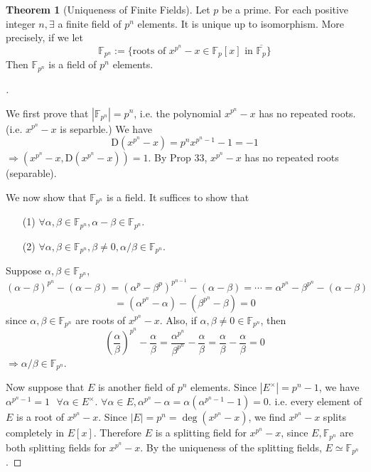 \documentclass[12pt]{article}
\newcommand{\sfa}{\text{  } \forall}
\theoremstyle{definition}
\newtheorem{thm}{Theorem}
\newenvironment{proofs}[1][\proofname]{%
  \begin{proof}[#1]$ $\par\nobreak\ignorespaces
}{%
  \end{proof}
}
\begin{document}
\clearpage
\begin{thm}[Uniqueness of Finite Fields]
	Let $p$ be a prime.
	For each positive integer $n, \exists$ a finite field of $p^n$ elements.
	It is unique up to isomorphism.
	More precisely, if we let
	\[
		\mathbb{F}_{p^n}:= \{ \text{roots of } x^{p^n} - x \in \mathbb{F}_p[x] \text{ in } \overline{\mathbb{F}_p} \}
	\]
	Then $\mathbb{F}_{p^n}$ is a field of $p^n$ elements.
\end{thm}

\begin{proofs}
	We first prove that $|\mathbb{F}_{p^n}| = p^n$, i.e. the polynomial $x^{p^n} - x$ has no repeated roots.(i.e. $x^{p^n} - x$ is separble.)
	We have
	\[
		\mathrm{D}(x^{p^n} - x) = p^n x^{p^n - 1} - 1 = -1
	\]
	$\Rightarrow (x^{p^n} - x, \mathrm{D} (x^{p^n} - x)) = 1$.
	By Prop 33, $x^{p^n} - x$ has no repeated roots (separable).

	We now show that $\mathbb{F}_{p^n}$ is a field.
	It suffices to show that
	\begin{enumerate}
		\item[(1)] $\forall \alpha, \beta \in \mathbb{F}_{p^n}, \alpha - \beta \in \mathbb{F}_{p^n}$.

		\item[(2)] $\forall \alpha, \beta \in \mathbb{F}_{p^n}, \beta \neq 0, \alpha/\beta \in \mathbb{F}_{p^n}$.
	\end{enumerate}
	Suppose $\alpha, \beta \in \mathbb{F}_{p^n}$,
	\[
		(\alpha - \beta)^{p^n} - (\alpha - \beta) = (\alpha^p - \beta^p)^{p^{n - 1}} - (\alpha - \beta) = \cdots = \alpha^{p^n} - \beta^{p^n} - (\alpha - \beta)
	\]
	\[
		= (\alpha^{p^n} - \alpha) - (\beta^{p^n} - \beta) = 0
	\]
	since $\alpha, \beta \in \mathbb{F}_{p^n}$ are roots of $x^{p^n} - x$.
	Also, if $\alpha, \beta \neq 0 \in \mathbb{F}_{p^n}$, then
	\[
		\left(\frac{\alpha}{\beta}\right)^{p^n} - \frac{\alpha}{\beta} = \frac{\alpha^{p^n}}{\beta^{p^n}} - \frac{\alpha}{\beta} = \frac{\alpha}{\beta} - \frac{\alpha}{\beta} = 0
	\]
	$\Rightarrow \alpha/\beta \in \mathbb{F}_{p^n}$.
	\par Now suppose that $E$ is another field of $p^n$ elements.
	Since $|E^\times| = p^n - 1$, we have $\alpha^{p^n - 1} = 1 \sfa \alpha \in E^\times$.
	$\forall \alpha \in E, \alpha^{p^n} - \alpha = \alpha(\alpha^{p^n - 1} - 1) = 0$.
	i.e. every element of $E$ is a root of $x^{p^n} - x$.
	Since $|E| = p^n = \deg(x^{p^n} - x)$, we find $x^{p^n} - x$ splits completely in $E[x]$.
	Therefore $E$ is a splitting field for $x^{p^n} - x$, since $E, \mathbb{F}_{p^n}$ are both splitting fields for $x^{p^n} - x$.
	By the uniqueness of the splitting fields, $E \simeq \mathbb{F}_{p^n}$.
\end{proofs}
\end{document}
